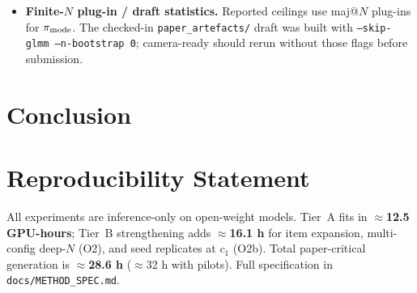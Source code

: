 \begin{itemize}
    margin --- the very quantity our mechanism analysis turns on --- and so
    would be expected to \emph{inflate} the interaction we report. We
    therefore run the ladder at \texttt{fp16} and treat reduced precision as
    a measured quantity rather than an assumption: the precision control
    (Figure F8, \texttt{fig8\_precision\_control.pdf}; Table T7,
    \texttt{tab7\_precision\_control.csv}) repeats the full decomposition at four-bit on the
    two smaller rungs, where quantisation damage is relatively largest and
    the extrapolation to the larger rung therefore runs in the favourable
    direction. The primary ladder was executed at \texttt{fp16} with HF
    \texttt{device\_map=auto} on 2$\times$T4; the four-bit control is a paired
    MATH-500 arm on the 1.5B/3B rungs (Table~\ref{tab:main-acc} discussion;
    Figure~F8). Draft P7 is inconclusive ($\rho_{\mathrm{disatt}}$ missing on
    the 4-bit arm); item\,$\times$\,config share movement is tiny.
  \item \textbf{Finite-$N$ plug-in / draft statistics.} Reported ceilings use
    maj@$N$ plug-ins for $\pi_{\mathrm{mode}}$. The checked-in \texttt{paper\_artefacts/}
    draft was built with \texttt{--skip-glmm --n-bootstrap 0}; camera-ready
    should rerun without those flags before submission.
\end{itemize}

\section{Conclusion}


\section*{Reproducibility Statement}
All experiments are inference-only on open-weight models. Tier~A fits in
\textbf{$\approx$12.5 GPU-hours}; Tier~B strengthening adds \textbf{$\approx$16.1 h}
for item expansion, multi-config deep-$N$ (O2), and seed replicates at $c_1$
(O2b). Total paper-critical generation is \textbf{$\approx$28.6 h} ($\approx$32 h
with pilots). Full specification in \texttt{docs/METHOD\_SPEC.md}.





